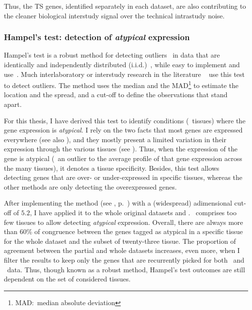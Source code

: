 Thus, the \gls{TS} genes, identified separately in each dataset,
are also contributing to the cleaner biological interstudy signal
over the technical intrastudy noise.\mybr\

\subsubsection{Hampel's test: detection of \emph{atypical} expression}\label{subsub:Hampel}

Hampel's test is a robust method
for detecting outliers~
in data that are identically and independently distributed (i.i.d.)~,
while easy to implement and use~.
Much interlaboratory or interstudy research in the literature
\eg~\citet{LinsingerHampel,Lewczuk2006-wq,Rocke1983-qa,Apfalter1999-ca}
use this test to detect outliers.
The method uses the median and the \gls{MAD}\footnote{MAD:~median absolute deviation}
to estimate the location and the spread,
and a cut-off to define the observations that stand apart.\mybr\

For this thesis, I have derived this test to identify conditions (\ie\ tissues)
where the gene expression is \emph{atypical}.
I rely on the two facts that
most genes are expressed everywhere 
(see also ),
and they mostly present a limited variation in their expression
through the various tissues (see ).
Thus, when the expression of the gene is atypical
(\ie\ an outlier to the average profile of that gene expression across the many tissues),
it denotes a tissue specificity.
Besides,
this test allows detecting genes that are over- or under-expressed in specific tissues,
whereas the other methods are only detecting the overexpressed genes.\mybr\

After implementing the method (see , p.~\pageref{algo:hampel})
with a (widespread) adimensional cut-off of $5.2$, %
I have applied it to the whole original datasets and \setTwo.
\setOne\ comprises too few tissues to allow detecting \emph{atypical} expression.
Overall, there are always more than 60\% of congruence between the genes tagged
as atypical in a specific tissue for the whole dataset
and the subset of twenty-three tissue.
The proportion of agreement between the partial and whole datasets increases,
even more, when I filter the results to keep only the genes that are recurrently
picked for both \uhlen\ and \gtex\ data.
Thus, though known as a robust method,
Hampel's test outcomes are still dependent on the set of considered tissues.\mybr\

